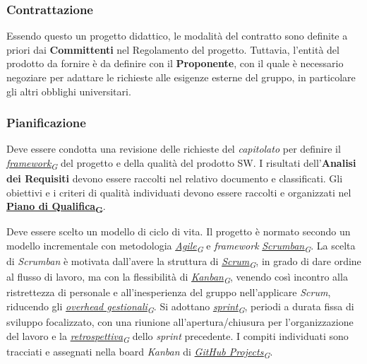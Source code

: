 \documentclass[12pt, a4paper]{article}
\newcommand{\urlglossario}{https://skynetunigroup.github.io/Code_Guardian/Documentazione/RTB/glossario_v1.0.0.pdf} %
\newcommand{\glo}[2]{\href{\urlglossario\#nameddest=#2}{#1\textsubscript{G}}}
\begin{document}
\subsubsection{Contrattazione}
Essendo questo un progetto didattico, le modalità del contratto sono definite a priori dai \textbf{Committenti} nel Regolamento del progetto. Tuttavia, l'entità del prodotto da fornire è da definire con il \textbf{Proponente}, con il quale è necessario negoziare per adattare le richieste alle esigenze esterne del gruppo, in particolare gli altri obblighi universitari.

\subsubsection{Pianificazione}
Deve essere condotta una revisione delle richieste del \textit{capitolato} per definire il \textit{\glo{framework}{framework}} del progetto e della qualità del prodotto SW. I risultati dell'\textbf{Analisi dei Requisiti} devono essere raccolti nel relativo documento e classificati. Gli obiettivi e i criteri di qualità individuati devono essere raccolti e organizzati nel \textbf{\glo{Piano di Qualifica}{piano-di-qualifica}}.

Deve essere scelto un modello di ciclo di vita. Il progetto è normato secondo un modello incrementale con metodologia \textit{\glo{Agile}{agile}} e \textit{framework} \textit{\glo{Scrumban}{scrumban}}. La scelta di \textit{Scrumban} è motivata dall'avere la struttura di \textit{\glo{Scrum}{scrum}}, in grado di dare ordine al flusso di lavoro, ma con la flessibilità di \textit{\glo{Kanban}{kanban}}, venendo così incontro alla ristrettezza di personale e all'inesperienza del gruppo nell'applicare \textit{Scrum}, riducendo gli \textit{\glo{overhead gestionali}{overhead-gestionali}}. Si adottano \textit{\glo{sprint}{sprint}}, periodi a durata fissa di sviluppo focalizzato, con una riunione all'apertura/chiusura per l'organizzazione del lavoro e la \textit{\glo{retrospettiva}{retrospettiva}} dello \textit{sprint} precedente. I compiti individuati sono tracciati e assegnati nella board \textit{Kanban} di \textit{\glo{GitHub Projects}{github-projects}}. 
\end{document}
